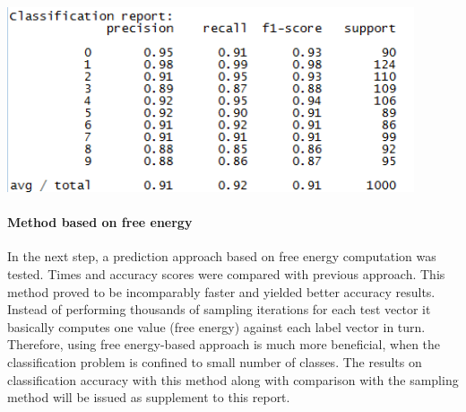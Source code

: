 \documentclass[a4paper]{scrartcl}
\begin{document}
\begin{center}
\includegraphics[width=12cm]{images/class_metrics.png}
\end{center}
\paragraph{Method based on free energy} In the next step, a prediction approach based on free energy computation was tested. Times and accuracy scores were compared with previous approach. This method proved to be incomparably faster and yielded better accuracy results. Instead of performing thousands of sampling iterations for each test vector it basically computes one value (free energy) against each label vector in turn. Therefore, using free energy-based approach is much more beneficial, when the classification problem is confined to small number of classes. 
The results on classification accuracy with this method along with comparison with the sampling method will be issued as supplement to this report.
\end{document}
